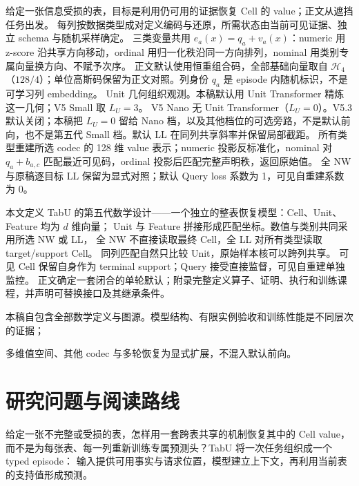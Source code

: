 \documentclass[11pt,UTF8,fontset=fandol]{ctexart}
\numberwithin{equation}{section}
\theoremstyle{definition}
\begin{document}
\begin{titlepage}
\begin{center}
\end{center}
\vspace{5mm}
\begin{dnareadbox}[本稿的中心问题]
给定一张信息受损的表，目标是利用仍可用的证据恢复 Cell 的 value；正文从遮挡任务出发。
每列按数据类型成对定义编码与还原，所需状态由当前可见证据、独立 schema 与随机采样确定。
三类变量共用 $e_a(x)=q_a+v_a(x)$：numeric 用 z-score 沿共享方向移动，ordinal 用归一化秩沿同一方向排列，nominal 用类别专属向量换方向、不赋予次序。
正文默认使用恒重组合码，全部基础向量取自 $\mathcal H_4$（$128/4$）；单位高斯码保留为正文对照。列身份 $q_a$ 是 episode 内随机标识，不是可学习列 embedding。
Unit 几何组织观测。本稿默认用 Unit Transformer 精炼这一几何；V5 Small 取 $L_U=3$。
V5 Nano 无 Unit Transformer（$L_U=0$）。V5.3 默认关闭；本稿把 $L_U=0$ 留给 Nano 档，以及其他档位的可选旁路，不是默认前向，也不是第五代 Small 档。默认 LL 在同列共享斜率并保留局部截距。
所有类型重建所选 codec 的 128 维 value 表示；numeric 投影反标准化，nominal 对 $q_a+b_{a,c}$ 匹配最近可见码，ordinal 投影后匹配完整声明秩，返回原始值。
全 NW 与原稿逐目标 LL 保留为显式对照；默认 Query loss 系数为 1，可见自重建系数为 0。
\end{dnareadbox}
\vspace{2mm}
\small
本文定义 TabU 的第五代数学设计——一个独立的整表恢复模型：Cell、Unit、Feature 均为 $d$ 维向量；
Unit 与 Feature 拼接形成匹配坐标。数值与类别共同采用所选 NW 或 LL，
全 NW 不直接读取最终 Cell，全 LL 对所有类型读取 target/support Cell。
同列匹配自然只比较 Unit，原始样本核可以跨列共享。
可见 Cell 保留自身作为 terminal support；Query 接受直接监督，可见自重建单独监控。
正文确定一套闭合的单轮默认；附录完整定义算子、证明、执行和训练课程，并声明可替换接口及其继承条件。
\vfill
{\footnotesize 本稿自包含全部数学定义与图源。模型结构、有限实例验收和训练性能是不同层次的证据；\par
多维值空间、其他 codec 与多轮恢复为显式扩展，不混入默认前向。\par}
\end{titlepage}
\hypersetup{pageanchor=true}
\begingroup
\makeatletter
\patchcmd{\l@section}{\addvspace{1.0em \@plus\p@}}{\addvspace{.40em \@plus\p@}}{}{}
\makeatother
\small
\tableofcontents
\endgroup
\clearpage

\section*{研究问题与阅读路线}
给定一张不完整或受损的表，怎样用一套跨表共享的机制恢复其中的 Cell value，
而不是为每张表、每一列重新训练专属预测头？TabU 将一次任务组织成一个 typed episode：
输入提供可用事实与请求位置，模型建立上下文，再利用当前表的支持值形成预测。
\end{document}
